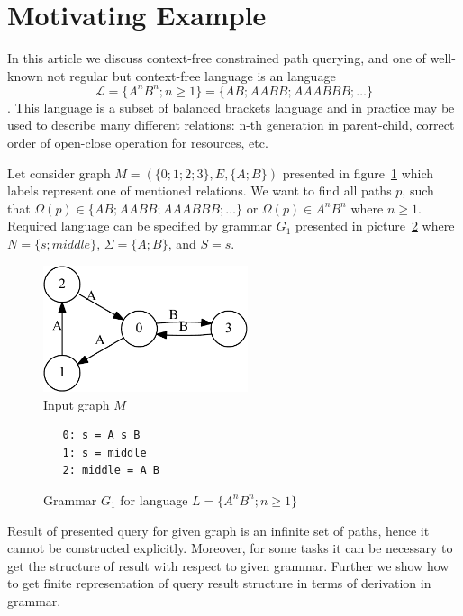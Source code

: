 \section{Motivating Example}\label{motivExample}

In this article we discuss context-free constrained path querying, and one of well-known not regular but context-free language is an 
language $$\mathcal{L} = \{A^n B^n; n \geq 1\} = \{AB; AABB; AAABBB; \dots\}$$.
This language is a subset of balanced brackets language and in practice may be used to describe many different relations: n-th generation in parent-child, correct order of open-close operation for resources, etc.

Let consider graph $M=(\{0;1;2;3\},E,\{A;B\})$ presented in figure~\ref{input} which labels represent one of mentioned relations.
We want to find all paths $p$, such that $\Omega(p) \in \{AB; AABB; AAABBB; \dots\}$ or $\Omega(p) \in A^n B^n$ where $n \geq 1$.
Required language can be specified by grammar $G_1$ presented in picture~\ref{grammarG} where $N = \{s; middle\}$, $\Sigma = \{A; B\}$, and $S = s$.

\begin{figure}[h]
    \begin{center}
        \includegraphics[width=6cm]{dot/input.pdf}
        \caption{Input graph $M$}
        \label{input}        
    \end{center}
\end{figure}

\begin{figure}[h]
   \begin{center}
\begin{verbatim}
   0: s = A s B 
   1: s = middle
   2: middle = A B
\end{verbatim}
   \caption{Grammar $G_1$ for language $L=\{A^n B^n; n \geq 1\}$}
   \label{grammarG}        
   \end{center}
\end{figure}

Result of presented query for given graph is an infinite set of paths, hence it cannot be constructed explicitly. 
Moreover, for some tasks it can be necessary to get the structure of result with respect to given grammar.
Further we show how to get finite representation of query result structure in terms of derivation in grammar.
